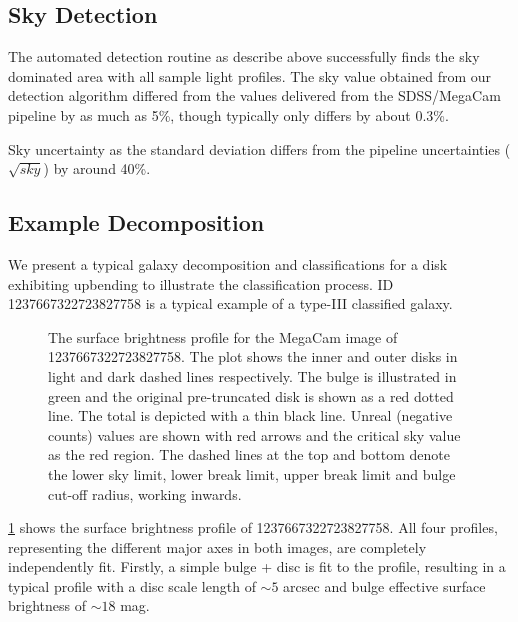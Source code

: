 


\subsection{Sky Detection} %
\label{sub:sky_detection}
The automated detection routine as describe above successfully finds the sky dominated area with all sample light profiles. The sky value obtained from our detection algorithm differed from the values delivered from the SDSS/MegaCam pipeline by as much as 5\%, though typically only differs by about 0.3\%. 
\begin{figure}
\end{figure}
Sky uncertainty as the standard deviation differs from the pipeline uncertainties ($\sqrt{sky}$) by around 40\%. 



\subsection{Example Decomposition} %
\label{sub:example_decompositions}
We present a typical galaxy decomposition and classifications for a disk exhibiting upbending to illustrate the classification process. ID 1237667322723827758 is a typical example of a type-III classified galaxy.

\begin{figure}
	\label{fig: The mega and sdss profiles of 1237667322723827758}
	\caption{The surface brightness profile for the MegaCam image of 1237667322723827758. The plot shows the inner and outer disks in light and dark dashed lines respectively. The bulge is illustrated in green and the original pre-truncated disk is shown as a red dotted line. The total is depicted with a thin black line.
	 Unreal (negative counts) values are shown with red arrows and the critical sky value as the red region. The dashed lines at the top and bottom denote the lower sky limit, lower break limit, upper break limit and bulge cut-off radius, working inwards.}
\end{figure}
\ref{fig: The mega and sdss profiles of 1237667322723827758} shows the surface brightness profile of 1237667322723827758. All four profiles, representing the different major axes in both images, are completely independently fit. Firstly, a simple bulge + disc is fit to the profile, resulting in a typical profile with a disc scale length of $\sim 5$ arcsec and bulge effective surface brightness of $\sim 18$ mag. 

